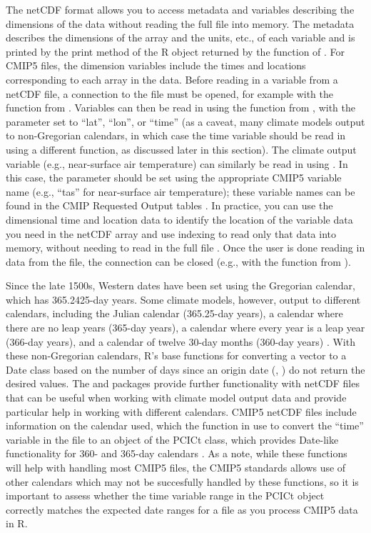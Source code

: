 The netCDF format allows you to access metadata and variables describing
the dimensions of the data without reading the full file into memory.
The metadata describes the dimensions of the array and the units, etc.,
of each variable and is printed by the print method of the R object
returned by the  function of . For CMIP5
files, the dimension variables include the times and locations
corresponding to each array in the data. Before reading in a variable
from a netCDF file, a connection to the file must be opened, for example
with the  function from . Variables can then
be read in using the  function from , with
the  parameter set to ``lat'', ``lon'', or ``time'' (as a
caveat, many climate models output to non-Gregorian calendars, in which
case the time variable should be read in using a different function, as
discussed later in this section). The climate output variable (e.g.,
near-surface air temperature) can similarly be read in using
. In this case, the  parameter should be
set using the appropriate CMIP5 variable name (e.g., ``tas'' for
near-surface air temperature); these variable names can be found in the
CMIP Requested Output tables \citep{taylor2010cmip5}. In practice, you
can use the dimensional time and location data to identify the location
of the variable data you need in the netCDF array and use indexing to
read only that data into memory, without needing to read in the full
file \citep{michna2013rnetcdf}. Once the user is done reading in data
from the file, the connection can be closed (e.g., with the
 function from ).

Since the late 1500s, Western dates have been set using the Gregorian
calendar, which has 365.2425-day years. Some climate models, however,
output to different calendars, including the Julian calendar (365.25-day
years), a calendar where there are no leap years (365-day years), a
calendar where every year is a leap year (366-day years), and a calendar
of twelve 30-day months (360-day years) \citep{cfconventions}. With
these non-Gregorian calendars, R's base functions for converting a
vector to a Date class based on the number of days since an origin date
(, ) do not return the desired values.
The  \citep{PCICt} and 
\citep{ncdf4.helpers} packages provide further functionality with netCDF
files that can be useful when working with climate model output data and
provide particular help in working with different calendars. CMIP5
netCDF files include information on the calendar used, which the
 function in  use to convert
the ``time'' variable in the file to an object of the PCICt class, which
provides Date-like functionality for 360- and 365-day calendars
\citep{PCICt}. As a note, while these functions will help with handling
most CMIP5 files, the CMIP5 standards allows use of other calendars
which may not be succesfully handled by these functions, so it is
important to assess whether the time variable range in the PCICt object
correctly matches the expected date ranges for a file as you process
CMIP5 data in R.

